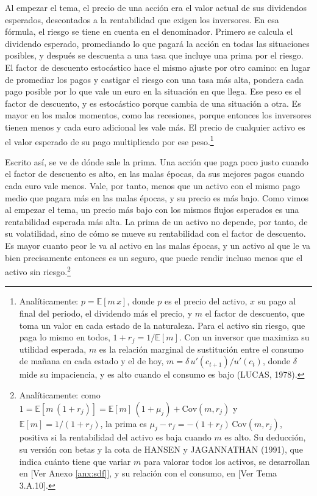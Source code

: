 \documentclass[10pt,a4paper]{article}
\newcommand{\authorfont}[1]{{\fontfamily{EBGaramond-TLF}\selectfont #1}}
\begin{document}
Al empezar el tema, el precio de una acción era el valor actual de sus dividendos esperados, descontados a la rentabilidad que exigen los inversores. En esa fórmula, el riesgo se tiene en cuenta en el denominador. Primero se calcula el dividendo esperado, promediando lo que pagará la acción en todas las situaciones posibles, y después se descuenta a una tasa que incluye una prima por el riesgo. El factor de descuento estocástico hace el mismo ajuste por otro camino: en lugar de promediar los pagos y castigar el riesgo con una tasa más alta, pondera cada pago posible por lo que vale un euro en la situación en que llega. Ese peso es el factor de descuento, y es estocástico porque cambia de una situación a otra. Es mayor en los malos momentos, como las recesiones, porque entonces los inversores tienen menos y cada euro adicional les vale más. El precio de cualquier activo es el valor esperado de su pago multiplicado por ese peso.\footnote{%
    Analíticamente: $p=\mathbb E[m\,x]$, donde $p$ es el precio del activo, $x$ su pago al final del periodo, el dividendo más el precio, y $m$ el factor de descuento, que toma un valor en cada estado de la naturaleza. Para el activo sin riesgo, que paga lo mismo en todos, $1+r_f=1/\mathbb E[m]$. Con un inversor que maximiza su utilidad esperada, $m$ es la relación marginal de sustitución entre el consumo de mañana en cada estado y el de hoy, $m=\delta\,u'(c_{t+1})/u'(c_t)$, donde $\delta$ mide su impaciencia, y es alto cuando el consumo es bajo (LUCAS, 1978).
}

Escrito así, se ve de dónde sale la prima. Una acción que paga poco justo cuando el factor de descuento es alto, en las malas épocas, da sus mejores pagos cuando cada euro vale menos. Vale, por tanto, menos que un activo con el mismo pago medio que pagara más en las malas épocas, y su precio es más bajo. Como vimos al empezar el tema, un precio más bajo con los mismos flujos esperados es una rentabilidad esperada más alta. La prima de un activo no depende, por tanto, de su volatilidad, sino de cómo se mueve su rentabilidad con el factor de descuento. Es mayor cuanto peor le va al activo en las malas épocas, y un activo al que le va bien precisamente entonces es un seguro, que puede rendir incluso menos que el activo sin riesgo.\footnote{%
    Analíticamente: como $1=\mathbb E[m\,(1+r_j)]=\mathbb E[m]\,(1+\mu_j)+\mathrm{Cov}(m,r_j)$ y $\mathbb E[m]=1/(1+r_f)$, la prima es $\mu_j-r_f=-(1+r_f)\,\mathrm{Cov}(m,r_j)$, positiva si la rentabilidad del activo es baja cuando $m$ es alto. Su deducción, su versión con betas y la cota de HANSEN y JAGANNATHAN (1991), que indica cuánto tiene que variar $m$ para valorar todos los activos, se desarrollan en [\authorfont{Ver Anexo \ref{anx:sdf}}], y su relación con el consumo, en [\authorfont{Ver Tema 3.A.10}].
}
\end{document}
